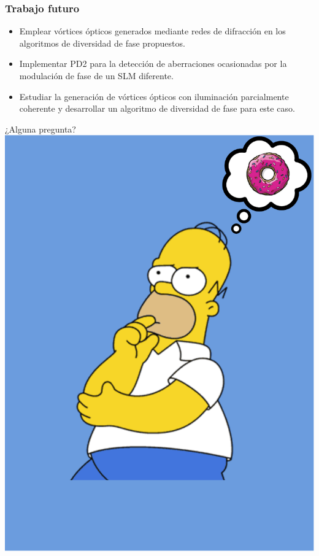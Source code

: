 \documentclass[serif,8pt]{beamer}
\begin{document}
		\begin{frame}
		\frametitle{Trabajo futuro}
		\begin{itemize}
		\item Emplear vórtices ópticos generados mediante redes de difracción en los algoritmos de diversidad de fase propuestos.
		\item Implementar PD2 para la detección de aberraciones ocasionadas por la modulación de fase de un SLM diferente.
		\item Estudiar la generación de vórtices ópticos con iluminación parcialmente coherente y desarrollar un algoritmo de diversidad de fase para este caso.

		\end{itemize}
		\end{frame}
%
%
\begin{frame}
\vfill
\centering
\huge ¿Alguna pregunta?\\
\includegraphics[height=\paperheight,keepaspectratio]{img/Final.eps}
\vfill
\end{frame}
\end{document}
